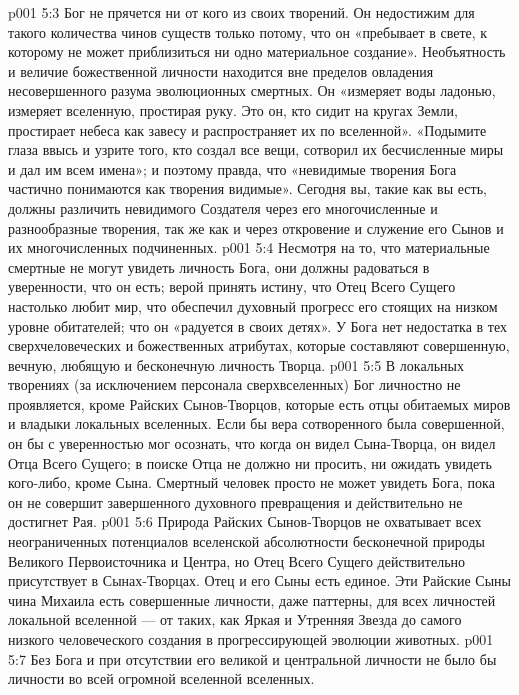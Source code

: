 \vs p001 5:3 Бог не прячется ни от кого из своих творений. Он недостижим для такого количества чинов существ только потому, что он «пребывает в свете, к которому не может приблизиться ни одно материальное создание». Необъятность и величие божественной личности находится вне пределов овладения несовершенного разума эволюционных смертных. Он «измеряет воды ладонью, измеряет вселенную, простирая руку. Это он, кто сидит на кругах Земли, простирает небеса как завесу и распространяет их по вселенной». «Подымите глаза ввысь и узрите того, кто создал все вещи, сотворил их бесчисленные миры и дал им всем имена»; и поэтому правда, что «невидимые творения Бога частично понимаются как творения видимые». Сегодня вы, такие как вы есть, должны различить невидимого Создателя через его многочисленные и разнообразные творения, так же как и через откровение и служение его Сынов и их многочисленных подчиненных.
\vs p001 5:4 Несмотря на то, что материальные смертные не могут увидеть личность Бога, они должны радоваться в уверенности, что он есть; верой принять истину, что Отец Всего Сущего настолько любит мир, что обеспечил духовный прогресс его стоящих на низком уровне обитателей; что он «радуется в своих детях». У Бога нет недостатка в тех сверхчеловеческих и божественных атрибутах, которые составляют совершенную, вечную, любящую и бесконечную личность Творца.
\vs p001 5:5 \pc В локальных творениях (за исключением персонала сверхвселенных) Бог личностно не проявляется, кроме Райских Сынов\hyp{}Творцов, которые есть отцы обитаемых миров и владыки локальных вселенных. Если бы вера сотворенного была совершенной, он бы с уверенностью мог осознать, что когда он видел Сына\hyp{}Творца, он видел Отца Всего Сущего; в поиске Отца не должно ни просить, ни ожидать увидеть кого\hyp{}либо, кроме Сына. Смертный человек просто не может увидеть Бога, пока он не совершит завершенного духовного превращения и действительно не достигнет Рая.
\vs p001 5:6 Природа Райских Сынов\hyp{}Творцов не охватывает всех неограниченных потенциалов вселенской абсолютности бесконечной природы Великого Первоисточника и Центра, но Отец Всего Сущего действительно  присутствует в Сынах\hyp{}Творцах. Отец и его Сыны есть единое. Эти Райские Сыны чина Михаила есть совершенные личности, даже паттерны, для всех личностей локальной вселенной --- от таких, как Яркая и Утренняя Звезда до самого низкого человеческого создания в прогрессирующей эволюции животных.
\vs p001 5:7 \pc Без Бога и при отсутствии его великой и центральной личности не было бы личности во всей огромной вселенной вселенных. 
